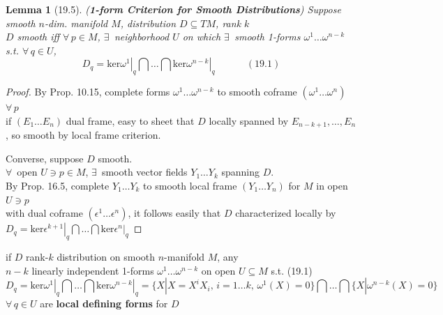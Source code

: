 \documentclass[11pt]{amsart}
\newtheorem{lemma}{Lemma}
\theoremstyle{definition}
\begin{document}
\begin{lemma}[19.5] (\textbf{1-form Criterion for Smooth Distributions}) Suppose smooth $n$-dim. manifold $M$, distribution $D \subseteq TM$, rank $k$  \\
$D$ smooth iff $\forall \, p \in M$, $\exists \, $ neighborhood $U$ on which $\exists \, $ smooth 1-forms $\omega^1 \dots \omega^{n-k}$ s.t. $\forall \, q \in U$,
\begin{equation}
  D_q = \text{ker} \left. \omega^1 \right|_q \bigcap \dots \bigcap \left. \text{ker} \omega^{n-k} \right|_q  \quad \quad \quad \, (19.1)
\end{equation}
\end{lemma}
 \begin{proof}
By Prop. 10.15, complete forms $\omega^1 \dots \omega^{n-k}$ to smooth coframe $(\omega^1 \dots \omega^n)$ \quad \, $\forall \, p$ \\
if $(E_1 \dots E_n)$ dual frame, easy to sheet that $D$ locally spanned by $E_{n-k+1 }, \dots , E_n$, so smooth by local frame criterion.

Converse, suppose $D$ smooth. \\
$\forall \, $ open $U \ni p \in M$, $\exists \, $ smooth vector fields $Y_1 \dots Y_k$ spanning $D$. \\
By Prop. 16.5, complete $Y_1 \dots Y_k$ to smooth local frame $(Y_1 \dots Y_n)$ for $M$ in open $U\ni p$ \\
with dual coframe $(\epsilon^1 \dots \epsilon^n)$, it follows easily that $D$ characterized locally by $D_q = \text{ker} \left. \epsilon^{k+1} \right|_q \bigcap \dots \bigcap \text{ker} \left. \epsilon^n \right|_q$

\end{proof}


if $D$ rank-$k$ distribution on smooth $n$-manifold $M$, any \\
\phantom{if $D$ } $n-k$ linearly independent 1-forms $\omega^1 \dots \omega^{n-k}$ on open $U\subseteq M$ s.t. (19.1)
\[
D_q = \left. \text{ker}\omega^1 \right|_q \bigcap \dots \bigcap \left. \text{ker}\omega^{n-k} \right|_q = \lbrace X | X=X^iX_i, \, i =1 \dots k, \, \omega^1(X) = 0\rbrace \bigcap \dots \bigcap \lbrace X | \omega^{n-k}(X) = 0\rbrace
\]
$\forall \, q \in U$ are \textbf{local defining forms} for $D$
\end{document}
